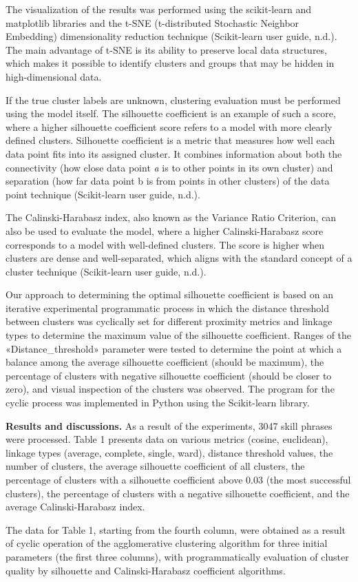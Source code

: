 \begin{multicols}{2}
The visualization of the results was performed using the scikit-learn
and matplotlib libraries and the t-SNE (t-distributed Stochastic
Neighbor Embedding) dimensionality reduction technique (Scikit-learn
user guide, n.d.). The main advantage of t-SNE is its ability to
preserve local data structures, which makes it possible to identify
clusters and groups that may be hidden in high-dimensional data.

If the true cluster labels are unknown, clustering evaluation must be
performed using the model itself. The silhouette coefficient is an
example of such a score, where a higher silhouette coefficient score
refers to a model with more clearly defined clusters. Silhouette
coefficient is a metric that measures how well each data point fits into
its assigned cluster. It combines information about both the
connectivity (how close data point \emph{a} is to other points in its
own cluster) and separation (how far data point b is from points in
other clusters) of the data point technique (Scikit-learn user guide,
n.d.).

The Calinski-Harabasz index, also known as the Variance Ratio Criterion,
can also be used to evaluate the model, where a higher Calinski-Harabasz
score corresponds to a model with well-defined clusters. The score is
higher when clusters are dense and well-separated, which aligns with the
standard concept of a cluster technique (Scikit-learn user guide, n.d.).

Our approach to determining the optimal silhouette coefficient is based
on an iterative experimental programmatic process in which the distance
threshold between clusters was cyclically set for different proximity
metrics and linkage types to determine the maximum value of the
silhouette coefficient. Ranges of the «Distance\_threshold» parameter
were tested to determine the point at which a balance among the average
silhouette coefficient (should be maximum), the percentage of clusters
with negative silhouette coefficient (should be closer to zero), and
visual inspection of the clusters was observed. The program for the
cyclic process was implemented in Python using the Scikit-learn library.

{\bfseries Results and discussions.} As a result of the experiments, 3047
skill phrases were processed. Table 1 presents data on various metrics
(cosine, euclidean), linkage types (average, complete, single, ward),
distance threshold values, the number of clusters, the average
silhouette coefficient of all clusters, the percentage of clusters with
a silhouette coefficient above 0.03 (the most successful clusters), the
percentage of clusters with a negative silhouette coefficient, and the
average Calinski-Harabasz index.

The data for Table 1, starting from the fourth column, were obtained as
a result of cyclic operation of the agglomerative clustering algorithm
for three initial parameters (the first three columns), with
programmatically evaluation of cluster quality by silhouette and
Calinski-Harabasz coefficient algorithms.
\end{multicols}

